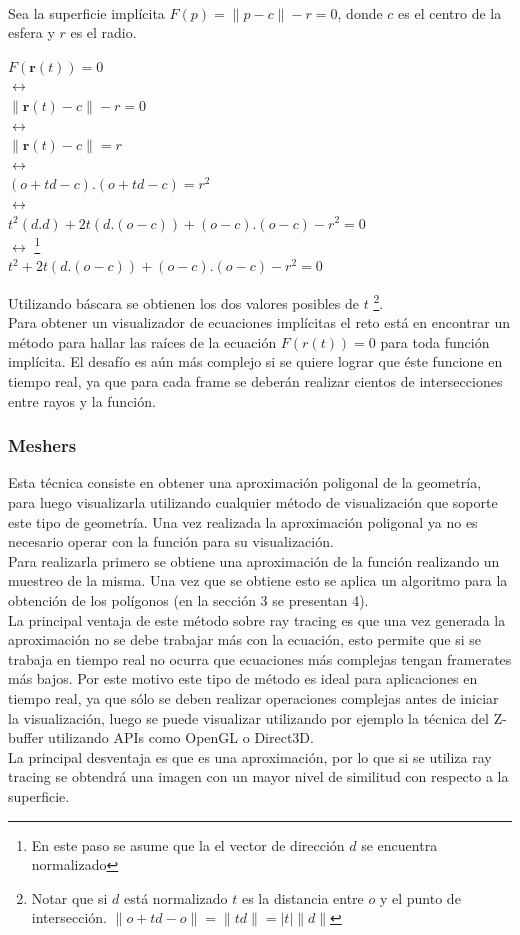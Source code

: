 \documentclass[12pt]{article}
\begin{document}
\\Sea la superficie implícita $F(p)=\lVert p -c \rVert - r = 0$, donde $c$ es el centro de la esfera y $r$ es el radio.
\begin{center}
$ F(\textbf{r}(t))= 0$
\\$ \leftrightarrow$
\\$ \lVert \textbf{r}(t) -c \rVert - r = 0$
\\$ \leftrightarrow$
\\$ \lVert \textbf{r}(t) -c \rVert = r$
\\ $\leftrightarrow$
\\ $(o+td -c).(o+td -c) = r^2 $ 
\\ $\leftrightarrow$
\\$t^2(d.d) + 2t(d.(o-c)) + (o-c).(o-c) - r^2=0$
\\ $\leftrightarrow$ \footnote{En este paso se asume que la el vector de dirección $d$ se encuentra normalizado}
\\$t^2 + 2t(d.(o-c)) + (o-c).(o-c) - r^2=0$
\end{center}
Utilizando báscara se obtienen los dos valores posibles de $t$ \footnote{Notar que si $d$ está normalizado $t$ es la distancia entre $o$ y el punto de intersección. $\lVert o + td - o \rVert = \lVert td\rVert = |t|\lVert d \rVert$}.
\\Para obtener un visualizador de ecuaciones implícitas el reto está en encontrar un método para hallar las raíces de la ecuación $F(r(t))=0$ para toda función implícita. El desafío es aún más complejo si se quiere lograr que éste funcione en tiempo real, ya que para cada frame se deberán realizar cientos de intersecciones entre rayos y la función.  
\subsubsection{Meshers}
Esta técnica consiste en obtener una aproximación poligonal de la geometría, para luego visualizarla utilizando cualquier método de visualización que soporte este tipo de geometría. Una vez realizada la aproximación poligonal ya no es necesario operar con la función para su visualización.
\\Para realizarla primero se obtiene una aproximación de la función realizando un muestreo de la misma. Una vez que se obtiene esto se aplica un algoritmo para la obtención de los polígonos (en la sección 3 se presentan 4)\cite{mykola1}\cite{mykola2}.
\\La principal ventaja de este método sobre ray tracing es que una vez generada la aproximación no se debe trabajar más con la ecuación, esto permite que si se trabaja en tiempo real no ocurra que ecuaciones más complejas tengan framerates más bajos. Por este motivo este tipo de método es ideal para aplicaciones en tiempo real, ya que sólo se deben realizar operaciones complejas antes de iniciar la visualización, luego se puede visualizar utilizando por ejemplo la técnica del Z-buffer utilizando APIs como OpenGL o Direct3D.
\\La principal desventaja es que es una aproximación, por lo que si se utiliza ray tracing se obtendrá una imagen con un mayor nivel de similitud con respecto a la superficie\cite{realtimerendering}.
\end{document}
